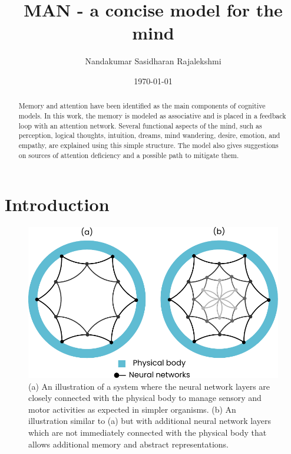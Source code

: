 \documentclass[reprint,amsmath,amssymb,apr,aip,onecolumn, 11pt]{revtex4-1}
\begin{document}
	
	\title{MAN - a concise model for the mind}
	
	\author{Nandakumar Sasidharan Rajalekshmi}
	

	
	
	\date{\today}
	\begin{abstract}
	Memory and attention have been identified as the main components of cognitive models. In this work, the memory is modeled as associative and is placed in a feedback loop with an attention network. Several functional aspects of the mind, such as perception, logical thoughts, intuition, dreams, mind wandering, desire, emotion, and empathy, are explained using this simple structure. The model also gives suggestions on sources of attention deficiency and a possible path to mitigate them.
		
	\end{abstract}
	
	\maketitle
	\section{Introduction}
	
	
	
	\begin{figure}[h!]
		\centerline{\includegraphics[width=0.65\linewidth]{figures/figure_man_animal_brain.pdf}}
		\caption{(a) An illustration of a system where the neural network layers are closely connected with the physical body to manage sensory and motor activities as expected in simpler organisms. (b) An illustration similar to (a) but with additional neural network layers which are not immediately connected with the physical body that allows additional memory and abstract representations. }
		\label{fig:man_animal}
	\end{figure}
	
\end{document}
